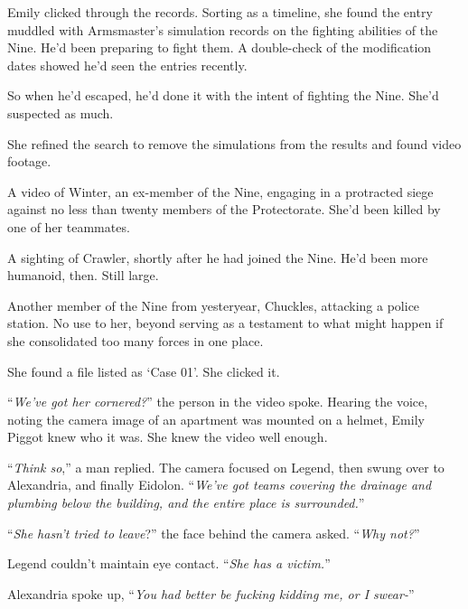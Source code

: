 Emily clicked through the records.  Sorting as a timeline, she found the entry muddled with Armsmaster's simulation records on the fighting abilities of the Nine.  He'd been preparing to fight them.  A double-check of the modification dates showed he'd seen the entries recently.



So when he'd escaped, he'd done it with the intent of fighting the Nine.  She'd suspected as much.



She refined the search to remove the simulations from the results and found video footage.



A video of Winter, an ex-member of the Nine, engaging in a protracted siege against no less than twenty members of the Protectorate.  She'd been killed by one of her teammates.



A sighting of Crawler, shortly after he had joined the Nine.  He'd been more humanoid, then.  Still large.



Another member of the Nine from yesteryear, Chuckles, attacking a police station.  No use to her, beyond serving as a testament to what might happen if she consolidated too many forces in one place.



She found a file listed as `Case 01'.  She clicked it.



``\emph{We've got her cornered?}'' the person in the video spoke.  Hearing the voice, noting the camera image of an apartment was mounted on a helmet, Emily Piggot knew who it was.  She knew the video well enough.



``\emph{Think so},'' a man replied.  The camera focused on Legend, then swung over to Alexandria, and finally Eidolon.  ``\emph{We've got teams covering the drainage and plumbing below the building, and the entire place is surrounded.}''



``\emph{She hasn't tried to leave}?'' the face behind the camera asked.  ``\emph{Why not?}''



Legend couldn't maintain eye contact.  ``\emph{She has a victim.}''



Alexandria spoke up, ``\emph{You had better be fucking kidding me, or I swear-}''



